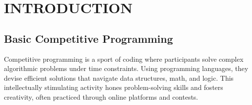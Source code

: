 \chapter{INTRODUCTION}
\section{Basic Competitive Programming}
Competitive programming is a sport of coding where participants solve complex algorithmic problems under time constraints. Using programming languages, they devise efficient solutions that navigate data structures, math, and logic. This intellectually stimulating activity hones problem-solving skills and fosters creativity, often practiced through online platforms and contests.